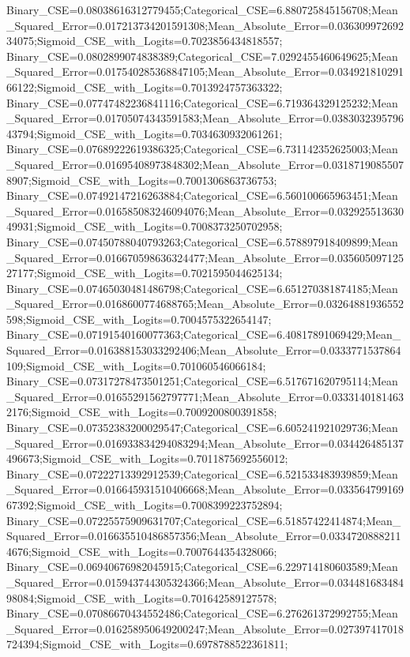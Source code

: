 Binary_CSE=0.08038616312779455;Categorical_CSE=6.880725845156708;Mean_Squared_Error=0.017213734201591308;Mean_Absolute_Error=0.03630997269234075;Sigmoid_CSE_with_Logits=0.7023856434818557;
Binary_CSE=0.0802899074838389;Categorical_CSE=7.0292455460649625;Mean_Squared_Error=0.017540285368847105;Mean_Absolute_Error=0.03492181029166122;Sigmoid_CSE_with_Logits=0.7013924757363322;
Binary_CSE=0.07747482236841116;Categorical_CSE=6.719364329125232;Mean_Squared_Error=0.01705074343591583;Mean_Absolute_Error=0.038303239579643794;Sigmoid_CSE_with_Logits=0.7034630932061261;
Binary_CSE=0.07689222619386325;Categorical_CSE=6.731142352625003;Mean_Squared_Error=0.01695408973848302;Mean_Absolute_Error=0.03187190855078907;Sigmoid_CSE_with_Logits=0.7001306863736753;
Binary_CSE=0.07492147216263884;Categorical_CSE=6.560100665963451;Mean_Squared_Error=0.016585083246094076;Mean_Absolute_Error=0.03292551363049931;Sigmoid_CSE_with_Logits=0.7008373250702958;
Binary_CSE=0.07450788040793263;Categorical_CSE=6.578897918409899;Mean_Squared_Error=0.016670598636324477;Mean_Absolute_Error=0.03560509712527177;Sigmoid_CSE_with_Logits=0.7021595044625134;
Binary_CSE=0.07465030481486798;Categorical_CSE=6.651270381874185;Mean_Squared_Error=0.0168600774688765;Mean_Absolute_Error=0.03264881936552598;Sigmoid_CSE_with_Logits=0.7004575322654147;
Binary_CSE=0.07191540160077363;Categorical_CSE=6.40817891069429;Mean_Squared_Error=0.016388153033292406;Mean_Absolute_Error=0.0333771537864109;Sigmoid_CSE_with_Logits=0.701060546066184;
Binary_CSE=0.07317278473501251;Categorical_CSE=6.517671620795114;Mean_Squared_Error=0.01655291562797771;Mean_Absolute_Error=0.03331401814632176;Sigmoid_CSE_with_Logits=0.7009200800391858;
Binary_CSE=0.07352383200029547;Categorical_CSE=6.605241921029736;Mean_Squared_Error=0.016933834294083294;Mean_Absolute_Error=0.034426485137496673;Sigmoid_CSE_with_Logits=0.7011875692556012;
Binary_CSE=0.07222713392912539;Categorical_CSE=6.521533483939859;Mean_Squared_Error=0.016645931510406668;Mean_Absolute_Error=0.03356479916967392;Sigmoid_CSE_with_Logits=0.7008399223752894;
Binary_CSE=0.07225575909631707;Categorical_CSE=6.51857422414874;Mean_Squared_Error=0.016635510486857356;Mean_Absolute_Error=0.03347208882114676;Sigmoid_CSE_with_Logits=0.7007644354328066;
Binary_CSE=0.06940676982045915;Categorical_CSE=6.229714180603589;Mean_Squared_Error=0.015943744305324366;Mean_Absolute_Error=0.03448168348498084;Sigmoid_CSE_with_Logits=0.701642589127578;
Binary_CSE=0.07086670434552486;Categorical_CSE=6.276261372992755;Mean_Squared_Error=0.016258950649200247;Mean_Absolute_Error=0.027397417018724394;Sigmoid_CSE_with_Logits=0.6978788522361811;
